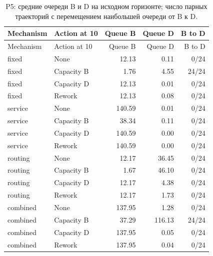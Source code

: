 \begin{longtable}{llrrr}\caption{P5: средние очереди B и D на исходном горизонте; число парных траекторий с перемещением наибольшей очереди от B к D.}\\\toprule

Mechanism & Action at 10 & Queue B & Queue D & B to D\\\midrule\endfirsthead

\toprule Mechanism & Action at 10 & Queue B & Queue D & B to D\\\midrule\endhead

fixed & None & 12.13 & 0.11 & 0/24\\

fixed & Capacity B & 1.76 & 4.55 & 24/24\\

fixed & Capacity D & 12.13 & 0.01 & 0/24\\

fixed & Rework & 12.13 & 0.08 & 0/24\\

service & None & 140.59 & 0.01 & 0/24\\

service & Capacity B & 38.34 & 0.11 & 0/24\\

service & Capacity D & 140.59 & 0.00 & 0/24\\

service & Rework & 140.59 & 0.00 & 0/24\\

routing & None & 12.17 & 36.45 & 0/24\\

routing & Capacity B & 1.67 & 46.10 & 0/24\\

routing & Capacity D & 12.17 & 4.38 & 0/24\\

routing & Rework & 12.17 & 1.73 & 0/24\\

combined & None & 137.95 & 1.28 & 0/24\\

combined & Capacity B & 37.29 & 116.13 & 24/24\\

combined & Capacity D & 137.95 & 0.05 & 0/24\\

combined & Rework & 137.95 & 0.04 & 0/24\\

\bottomrule\end{longtable}
